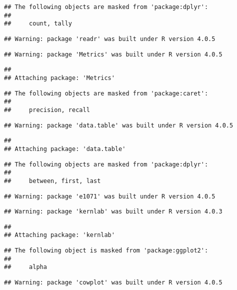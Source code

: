 \documentclass[
]{article}
\begin{document}
\begin{verbatim}
## The following objects are masked from 'package:dplyr':
## 
##     count, tally
\end{verbatim}

\begin{verbatim}
## Warning: package 'readr' was built under R version 4.0.5
\end{verbatim}

\begin{verbatim}
## Warning: package 'Metrics' was built under R version 4.0.5
\end{verbatim}

\begin{verbatim}
## 
## Attaching package: 'Metrics'
\end{verbatim}

\begin{verbatim}
## The following objects are masked from 'package:caret':
## 
##     precision, recall
\end{verbatim}

\begin{verbatim}
## Warning: package 'data.table' was built under R version 4.0.5
\end{verbatim}

\begin{verbatim}
## 
## Attaching package: 'data.table'
\end{verbatim}

\begin{verbatim}
## The following objects are masked from 'package:dplyr':
## 
##     between, first, last
\end{verbatim}

\begin{verbatim}
## Warning: package 'e1071' was built under R version 4.0.5
\end{verbatim}

\begin{verbatim}
## Warning: package 'kernlab' was built under R version 4.0.3
\end{verbatim}

\begin{verbatim}
## 
## Attaching package: 'kernlab'
\end{verbatim}

\begin{verbatim}
## The following object is masked from 'package:ggplot2':
## 
##     alpha
\end{verbatim}

\begin{verbatim}
## Warning: package 'cowplot' was built under R version 4.0.5
\end{verbatim}
\end{document}
